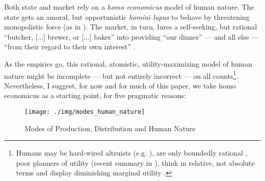\documentclass[11pt,a4paper,oneside,openright]{article}
\begin{document}
\begin{enumerate}
	Both state and market rely on a \emph{homo economicus} model of human nature. The state gets an amoral, but opportunistic \emph{homini lupus} to behave by threatening monopolistic force (as in \citealt{Hobbes-1651-aa}). The market, in turn, lures a self-seeking, but rational ``butcher, [...] brewer, or [...] baker'' into providing ``our dinner'' --- and all else --- ``from their regard to their own interest'' \citep{Smith-1776-lq}.

	As the empirics go, this rational, atomistic, utility-maximizing model of human nature might be incomplete --- but not entirely incorrect --- on all counts\footnote
		{Humans may be hard-wired altruists (e.g. \citealt{Zak2004}), are only boundedly rational \citep{Simon-1999-aa,Kahneman2011}, poor planners of utility (recent summary in \citealt{Gilbert2006}), think in relative, not absolute terms \citep{Frank2005} and display diminishing marginal utility \citep{Ng-1997-aa,Veenhoven-2000-aa,Nickell2008}.}. 
	Nevertheless, I suggest, for now and for much of this paper, we take homo economicus as a starting point, for five pragmatic reasons:%
	
	
\begin{figure}[htbp]
	\centering
	\texttt{[image: ./img/modes\_human\_nature]}  
	\caption{Modes of Production, Distribution and Human Nature}
	\label{fig:modes_human_nature}
\end{figure} 


\end{enumerate}
\end{document}
